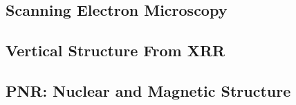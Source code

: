 \documentclass[\main/dresen_thesis.tex]{subfiles}
\renewcommand{\thisPath}{\main/chapters/doublelayers/doubleLayers}
\begin{document}
  \subsection{Scanning Electron Microscopy}
  
    \FloatBarrier

  \subsection{Vertical Structure From XRR}
  
    \FloatBarrier

  \subsection{PNR: Nuclear and Magnetic Structure}
  
    \FloatBarrier
\end{document}
